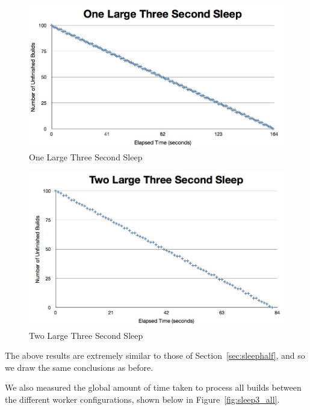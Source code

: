\documentclass{scrartcl}
\begin{document}
\begin{figure}[here]
  \begin{center}
    \includegraphics[scale=0.45]{raw_data/sleep3/one_large/graph.jpg}
  \end{center}
  \caption{One Large Three Second Sleep}
  \label{fig:sleep3_one_large_queuelength}
\end{figure}

\begin{figure}[here]
  \begin{center}
    \includegraphics[scale=0.45]{raw_data/sleep3/two_large/graph.jpg}
  \end{center}
  \caption{Two Large Three Second Sleep}
  \label{fig:sleep3_two_large_queuelength}
\end{figure}

The above results are extremely similar to those of Section~\ref{sec:sleephalf}, and so we draw the same conclusions as before.

We also measured the global amount of time taken to process all builds between the different worker configurations, shown below in Figure~\ref{fig:sleep3_all}.
\end{document}
